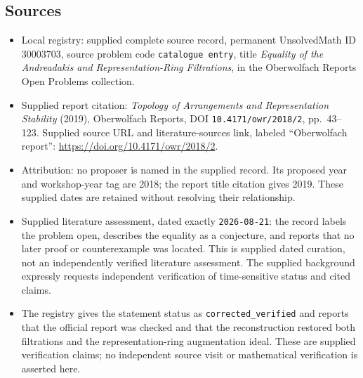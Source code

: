 \documentclass[11pt]{article}
\begin{document}
\subsection{Sources}
\begin{itemize}
\item Local registry: supplied complete source record, permanent UnsolvedMath ID \(30003703\), source problem code \texttt{catalogue entry}, title \emph{Equality of the Andreadakis and Representation-Ring Filtrations}, in the Oberwolfach Reports Open Problems collection.
\item Supplied report citation: \emph{Topology of Arrangements and Representation Stability} (2019), Oberwolfach Reports, DOI \texttt{10.4171/owr/2018/2}, pp.\ 43--123. Supplied source URL and literature-sources link, labeled ``Oberwolfach report'': \url{https://doi.org/10.4171/owr/2018/2}.
\item Attribution: no proposer is named in the supplied record. Its proposed year and workshop-year tag are 2018; the report title citation gives 2019. These supplied dates are retained without resolving their relationship.
\item Supplied literature assessment, dated exactly \texttt{2026-08-21}: the record labels the problem open, describes the equality as a conjecture, and reports that no later proof or counterexample was located. This is supplied dated curation, not an independently verified literature assessment. The supplied background expressly requests independent verification of time-sensitive status and cited claims.
\item The registry gives the statement status as \texttt{corrected\_verified} and reports that the official report was checked and that the reconstruction restored both filtrations and the representation-ring augmentation ideal. These are supplied verification claims; no independent source visit or mathematical verification is asserted here.
\end{itemize}
\end{document}
